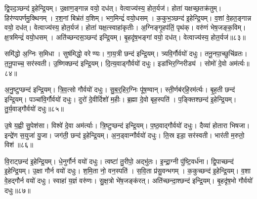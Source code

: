 द्वि॒पद॒ञ्छन्द॑ इ॒हेन्द्रि॒यम्।
उ॒क्षाण॒ङ्गान्न वयो॒ दध॑त्।
वेत्वाज्य॑स्य॒ होत॒र्यज॑।
होता॑ यक्षच्छ॒तक्र॑तुम्।
हिर॑ण्यपर्णमु॒क्थिनम्।
र॒श॒नां बिभ्र॑तं व॒शिम्।
भग॒मिन्द्रं॑ वयो॒धसम्।
क॒कुभ॒ञ्छन्द॑ इ॒हेन्द्रि॒यम्।
व॒शां वे॒हत॒ङ्गान्न वयो॒ दध॑त्।
वेत्वाज्य॑स्य॒ होत॒र्यज॑।
होता॑ यक्ष॒त्स्वाहा॑कृतीः।
अ॒ग्निङ्गृ॒हप॑तिं॒ पृथ॑क्।
वरु॑णं भेष॒जङ्क॒विम्।
क्ष॒त्रमिन्द्रं॑ वयो॒धसम्।
अति॑च्छन्दस॒ञ्छन्द॑ इन्द्रि॒यम्।
बृ॒हदृ॑ष॒भङ्गां वयो॒ दध॑त्।
वेत्वाज्य॑स्य॒ होत॒र्यज॑॥८३॥

समि॑द्धो अ॒ग्निः स॒मिधा।
सुष॑मिद्धो॒ वरेण्यः।
गा॒य॒त्री छन्द॑ इन्द्रि॒यम्।
त्र्यवि॒र्गौर्वयो॑ दधुः।
तनू॒नपा॒च्छुचि॑व्रतः।
त॒नू॒पाच्च॒ सर॑स्वती।
उ॒ष्णिक्छन्द॑ इन्द्रि॒यम्।
दि॒त्य॒वाड्गौर्वयो॑ दधुः।
इडा॑भिर॒ग्निरीड्य॑।
सोमो॑ दे॒वो अम॑र्त्यः॥८४॥

अ॒नु॒ष्टुप्छन्द॑ इन्द्रि॒यम्।
त्रि॒व॒त्सो गौर्वयो॑ दधुः।
सु॒ब॒र्॒हिर॒ग्निः पू॑ष॒ण्वान्।
स्ती॒र्णब॑र्‌हि॒रम॑र्त्यः।
बृ॒ह॒ती छन्द॑ इन्द्रि॒यम्।
पञ्चा॑वि॒र्गौर्वयो॑ दधुः।
दुरो॑ दे॒वीर्दिशो॑ म॒हीः।
ब्र॒ह्मा दे॒वो बृह॒स्पति॑।
प॒ङ्क्तिश्छन्द॑ इ॒हेन्द्रि॒यम्।
तु॒र्य॒वाड्गौर्वयो॑ दधुः॥८५॥

उ॒षे य॒ह्वी सु॒पेश॑सा।
विश्वे॑ दे॒वा अम॑र्त्याः।
त्रि॒ष्टुप्छन्द॑ इन्द्रि॒यम्।
प॒ष्ठ॒वाद्गौर्वयो॑ दधुः।
दैव्या॑ होतारा भिषजा।
इन्द्रे॑ण स॒युजा॑ यु॒जा।
जग॑ती॒ छन्द॑ इ॒हेन्द्रि॒यम्।
अ॒न॒ड्वान्गौर्वयो॑ दधुः।
ति॒स्र इडा॒ सर॑स्वती।
भार॑ती म॒रुतो॒ विश॑॥८६॥

वि॒राट्छन्द॑ इ॒हेन्द्रि॒यम्।
धे॒नुर्गौर्न वयो॑ दधुः।
त्वष्टा॑ तु॒रीपो॒ अद्भु॑तः।
इ॒न्द्रा॒ग्नी पु॑ष्टि॒वर्ध॑ना।
द्वि॒पाच्छन्द॑ इ॒हेन्द्रि॒यम्।
उ॒क्षा गौर्न वयो॑ दधुः।
श॒मि॒ता नो॒ वन॒स्पति॑।
स॒वि॒ता प्र॑सु॒वन्भगम्।
क॒कुच्छन्द॑ इ॒हेन्द्रि॒यम्।
व॒शा वे॒हद्गौर्न वयो॑ दधुः।
स्वाहा॑ य॒ज्ञं वरु॑णः।
सु॒क्ष॒त्रो भे॑ष॒जङ्क॑रत्।
अति॑च्छन्दा॒श्छन्द॑ इन्द्रि॒यम्।
बृ॒हदृ॑ष॒भो गौर्वयो॑ दधुः॥८७॥\anuvakamend[अम॑र्त्यस्तुर्य॒वाड्गौर्वयो॑ दधु॒र्विशो॑ व॒शा वे॒हद्गौर्न वयो॑ दधुश्च॒त्वारि॑ च]

